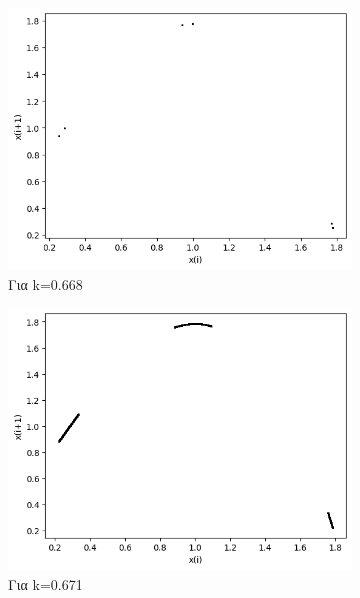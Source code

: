 \begin{figure}[h!]
\begin{subfigure}[b]{0.25\textwidth}
		\includegraphics[width=\textwidth]{LateX images/graphs q09/g10}
		\caption{Για k=0.668}
		\label{f:k56}
	\end{subfigure}
	\hfill
	\begin{subfigure}[b]{0.25\textwidth}
		\centering
		\includegraphics[width=\textwidth]{LateX images/graphs q09/g11}
		\caption{Για k=0.671}
		\label{f:k57}
	\end{subfigure}
	\hfill
	\begin{subfigure}[b]{0.25\textwidth}
		\centering

\end{subfigure}
\end{figure}
